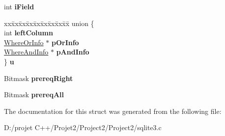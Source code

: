 \begin{DoxyCompactItemize}
int {\bfseries i\+Field}
\item 
\mbox{\label{struct_where_term_a33c134588b7a06e894cb6598e01e1ab8}} 
\begin{tabbing}
xx\=xx\=xx\=xx\=xx\=xx\=xx\=xx\=xx\=\kill
union \{\\
\>int {\bfseries leftColumn}\\
\>\mbox{\hyperlink{struct_where_or_info}{WhereOrInfo}} $\ast$ {\bfseries pOrInfo}\\
\>\mbox{\hyperlink{struct_where_and_info}{WhereAndInfo}} $\ast$ {\bfseries pAndInfo}\\
\} {\bfseries u}\\

\end{tabbing}\item 
\mbox{\label{struct_where_term_a1274011fa1ef0639284b7944f4570e67}} 
Bitmask {\bfseries prereq\+Right}
\item 
\mbox{\label{struct_where_term_a49b700336b005067352366cfc40de07f}} 
Bitmask {\bfseries prereq\+All}
\end{DoxyCompactItemize}


The documentation for this struct was generated from the following file\+:\begin{DoxyCompactItemize}
\item 
D\+:/projet C++/\+Projet2/\+Project2/\+Project2/sqlite3.\+c\end{DoxyCompactItemize}
